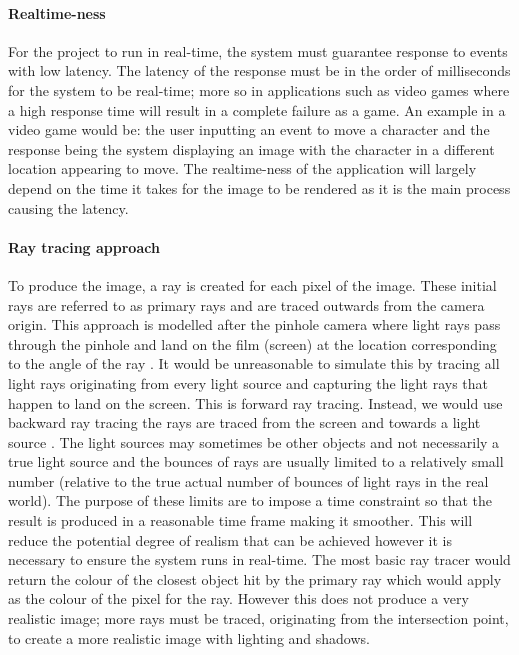 \documentclass[final]{cmpreport}
\begin{document}
\paragraph{Realtime-ness} For the project to run in real-time, the system must guarantee response to events with low latency. The latency of the response must be in the order of milliseconds for the system to be real-time; more so in applications such as video games where a high response time will result in a complete failure as a game. An example in a video game would be: the user inputting an event to move a character and the response being the system displaying an image with the character in a different location appearing to move. The realtime-ness of the application will largely depend on the time it takes for the image to be rendered as it is the main process causing the latency.

\paragraph{Ray tracing approach} To produce the image, a ray is created for each pixel of the image. These initial rays are referred to as primary rays and are traced outwards from the camera origin. This approach is modelled after the pinhole camera where light rays pass through the pinhole and land on the film (screen) at the location corresponding to the angle of the ray \citep[1.1.2]{introraytracing}. It would be unreasonable to simulate this by tracing all light rays originating from every light source and capturing the light rays that happen to land on the screen. This is forward ray tracing. Instead, we would use backward ray tracing the rays are traced from the screen and towards a light source \citep[1.2]{introraytracing}. The light sources may sometimes be other objects and not necessarily a true light source and the bounces of rays are usually limited to a relatively small number (relative to the true actual number of bounces of light rays in the real world). The purpose of these limits are to impose a time constraint so that the result is produced in a reasonable time frame making it smoother. This will reduce the potential degree of realism that can be achieved however it is necessary to ensure the system runs in real-time. The most basic ray tracer would return the colour of the closest object hit by the primary ray which would apply as the colour of the pixel for the ray. However this does not produce a very realistic image; more rays must be traced, originating from the intersection point, to create a more realistic image with lighting and shadows.
\end{document}
